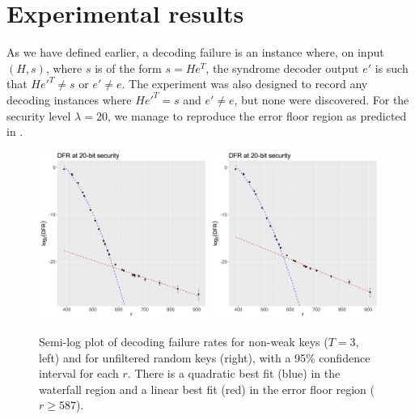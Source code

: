 \section{Experimental results}

As we have defined earlier, a decoding failure is an instance where, on input $(H,s)$, where $s$ is of the form $s=He^T$, the syndrome decoder output $e'$ is such that $He'^T \ne s$ or $e' \ne e$.  The experiment was also designed to record any decoding instances where $He'^T=s$ and $e'\ne e$, but none were discovered. For the security level $\lambda = 20$, we manage to reproduce the error floor region as predicted in \cite{Richardson03}.

\begin{figure}[htbp]
  \begin{center}
    \includegraphics[width=0.49\textwidth]{2_bike/DFR-plot-T3.png}
    \includegraphics[width=0.49\textwidth]{2_bike/DFR-plot-random.png}
  \end{center}
  \caption{Semi-log plot of decoding failure rates for non-weak keys ($T = 3$, left) and for unfiltered random keys (right), with a 95\% confidence interval for each $r$. There is a quadratic best fit (blue) in the waterfall region and a linear best fit (red) in the error floor region ($r \geq 587$).}
  \label{fig:DFR}
\end{figure}

